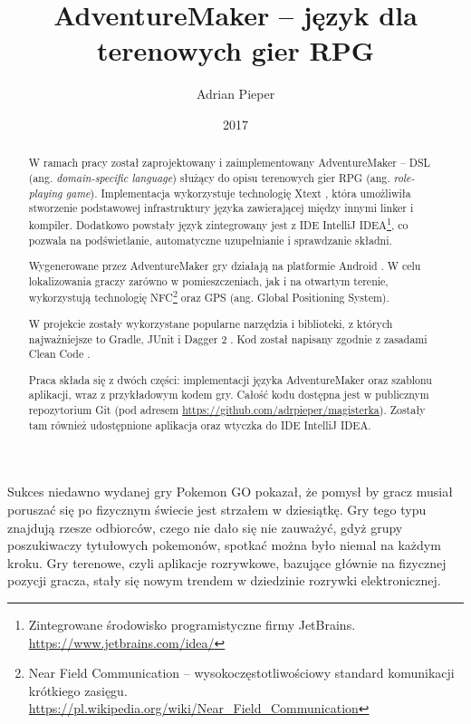 \documentclass[openright]{xmgr}
\author   {Adrian Pieper}
\title    {AdventureMaker -- język dla terenowych gier RPG}
\date     {2017}
\begin{document}
\begin{abstract}
  W ramach pracy został zaprojektowany i zaimplementowany AdventureMaker -- DSL (ang. \textit{domain-specific language}) służący do opisu terenowych gier RPG (ang. \textit{role-playing game}). Implementacja wykorzystuje technologię Xtext \cite{Xtext:2017:Doc}, która umożliwiła stworzenie podstawowej infrastruktury języka zawierającej między innymi linker i kompiler. Dodatkowo powstały język zintegrowany jest z IDE IntelliJ IDEA\footnote{Zintegrowane środowisko programistyczne firmy JetBrains. \url{https://www.jetbrains.com/idea/}}, co pozwala na podświetlanie, automatyczne uzupełnianie i sprawdzanie składni.
  
  Wygenerowane przez AdventureMaker gry działają na platformie Android \cite{AndroidSDK:2017:Doc}. W celu lokalizowania graczy zarówno w pomieszczeniach, jak i na otwartym terenie, wykorzystują technologię NFC\footnote{Near Field Communication -- wysokoczęstotliwościowy standard komunikacji krótkiego zasięgu. \url{https://pl.wikipedia.org/wiki/Near_Field_Communication}} oraz GPS (ang. Global Positioning System).
  
  W projekcie zostały wykorzystane popularne narzędzia i biblioteki, z których najważniejsze to Gradle\cite{Gradle:2017:Doc}, JUnit\cite{JUnit:2017:Doc} i Dagger 2 \cite{Dagger2:2017:Doc}. Kod został napisany zgodnie z zasadami Clean Code \cite{CleanCode:2005}.
  
  Praca składa się z dwóch części: implementacji języka AdventureMaker oraz szablonu aplikacji, wraz z przykładowym kodem gry. Całość kodu dostępna jest w publicznym repozytorium Git (pod adresem \url{https://github.com/adrpieper/magisterka}). Zostały tam również udostępnione aplikacja oraz wtyczka do IDE IntelliJ IDEA.
\end{abstract}


\maketitle

\introduction

Sukces niedawno wydanej gry Pokemon GO pokazał, że pomysł by gracz musiał poruszać się po fizycznym świecie jest strzałem w dziesiątkę. Gry tego typu znajdują rzesze odbiorców, czego nie dało się nie zauważyć, gdyż grupy poszukiwaczy tytułowych pokemonów, spotkać można było niemal na każdym kroku. Gry terenowe, czyli aplikacje rozrywkowe, bazujące głównie na fizycznej pozycji gracza, stały się nowym trendem w dziedzinie rozrywki elektronicznej.
\end{document}
